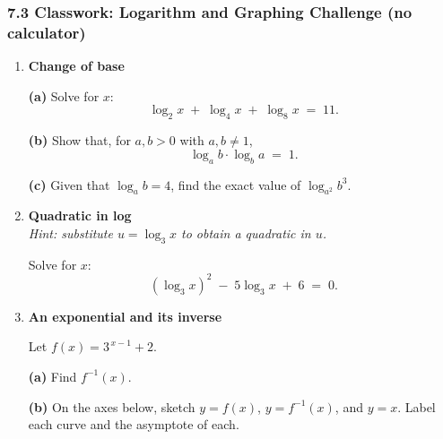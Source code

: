 \documentclass[12pt, twoside]{article}
\begin{document}
\subsubsection*{7.3 Classwork: Logarithm and Graphing Challenge (no calculator)}

\begin{enumerate}[itemsep=0.5cm]

\item[1.] \textbf{Change of base}

\textbf{(a)} Solve for $x$:
$$\log_2 x \;+\; \log_4 x \;+\; \log_8 x \;=\; 11.$$

\vspace{8cm}

\textbf{(b)} Show that, for $a, b > 0$ with $a, b \neq 1$,
$$\log_a b \cdot \log_b a \;=\; 1.$$

\vspace{7cm}

\newpage
\textbf{(c)} Given that $\log_a b = 4$, find the exact value of
$\log_{a^2} b^3$.

\vspace{7cm}


\item[2.] \textbf{Quadratic in log} \\[0.25cm]
\textit{Hint: substitute $u = \log_3 x$ to obtain a quadratic in $u$.}

Solve for $x$:
$$(\log_3 x)^2 \;-\; 5 \log_3 x \;+\; 6 \;=\; 0.$$

\vspace{0.4cm}


\vspace{16cm}

\newpage

\item[3.] \textbf{An exponential and its inverse}

Let $f(x) = 3^{\,x-1} + 2$.

\textbf{(a)} Find $f^{-1}(x)$.

\vspace{5cm}

\textbf{(b)} On the axes below, sketch $y = f(x)$, $y = f^{-1}(x)$, and
$y = x$. Label each curve and the asymptote of each.

\vspace{0.3cm}

\begin{center}
\end{center}


\end{enumerate}
\end{document}
